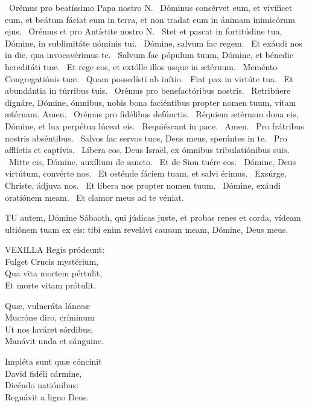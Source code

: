 \V\ Orémus pro beatíssimo Papa nostro N. \R\ Dóminus consérvet eum, et vivíficet eum, et beátum fáciat eum in terra, et non tradat eum in ánimam inimicórum ejus. \V\ Orémus et pro Antístite nostro N. \R\ Stet et pascat in fortitúdine tua, Dómine, in sublimitáte nóminis tui. \V\ Dómine, salvum fac regem. \R\ Et exáudi nos in die, qua invocavérimus te. \V\ Salvum fac pópulum tuum, Dómine, et bénedic hereditáti tuæ. \R\ Et rege eos, et extólle illos usque in ætérnum. \V\ Meménto Congregatiónis tuæ. \R\ Quam possedísti ab inítio. \V\ Fiat pax in virtúte tua. \R\ Et abundántia in túrribus tuis. \V\ Orémus pro benefactóribus nostris. \R\ Retribúere dignáre, Dómine, ómnibus, nobis bona faciéntibus propter nomen tuum, vitam ætérnam. Amen. \V\ Orémus pro fidélibus defúnctis. \R\ Réquiem ætérnam dona eis, Dómine, et lux perpétua lúceat eis. \V\ Requiéscant in pace. \R\ Amen. \V\ Pro frátribus nostris abséntibus. \R\ Salvos fac servos tuos, Deus meus, sperántes in te. \V\ Pro afflíctis et captívis. \R\ Líbera eos, Deus Israël, ex ómnibus tribulatiónibus suis. \V\ Mitte eis, Dómine, auxílium de sancto. \R\ Et de Sion tuére eos. \V\ Dómine, Deus virtútum, convérte nos. \R\ Et osténde fáciem tuam, et salvi érimus. \V\ Exsúrge, Christe, ádjuva nos. \R\ Et líbera nos propter nomen tuum. \V\ Dómine, exáudi oratiónem meam. \R\ Et clamor meus ad te véniat.



\lettrine[lines=2]{T}{U} autem, Dómine Sábaoth, qui júdicas juste, et probas renes et corda, vídeam ultiónem tuam ex eis: tibi enim revelávi causam meam, Dómine, Deus meus.


\lettrine[lines=2]{V}{EXILLA} Regis pródeunt:\\
Fulget Crucis mystérium,\\
Qua vita mortem pértulit,\\
Et morte vitam prótulit.

Quæ, vulneráta lánceæ\\
Mucróne diro, críminum\\
Ut nos laváret sórdibus,\\
Manávit unda et sánguine.

Impléta sunt quæ cóncinit\\
David fidéli cármine,\\
Dicéndo natiónibus:\\
Regnávit a ligno Deus.

